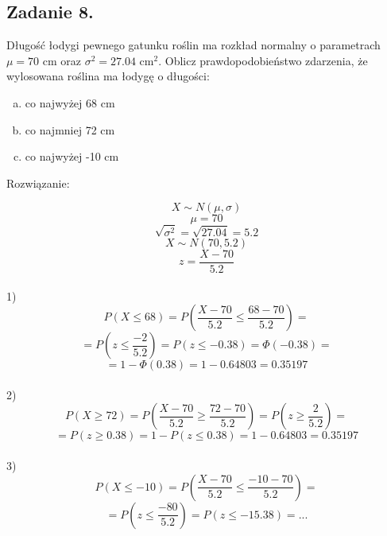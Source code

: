 
\subsection{Zadanie 8.}
Długość łodygi pewnego gatunku roślin ma rozkład normalny o parametrach $\mu = 70$ cm oraz $\sigma^2 = 27.04$ $\mbox{cm}^2$.
Oblicz prawdopodobieństwo zdarzenia, że wylosowana roślina ma łodygę o długości:
\begin{enumerate}[a)]
\item co najwyżej 68 cm
\item co najmniej  72 cm
\item co najwyżej -10 cm
\end{enumerate}


Rozwiązanie:

$$ X \sim N ( \mu, \sigma ) $$
$$\mu = 70$$
$$ \sqrt{ \sigma^2 } = \sqrt{27.04} = 5.2 $$
$$ X \sim N ( 70, 5.2 ) $$
$$ z = \frac{X - 70}{5.2} $$ \\

1) 
$$ P( X \le 68 ) = P(  \frac{X - 70}{5.2} \le \frac{68 - 70}{5.2} ) = $$
$$ = P( z \le \frac{-2}{5.2} ) =  P( z \le -0.38 ) = \Phi(-0.38) = $$
$$ = 1 - \Phi(0.38) = 1 - 0.64803 = 0.35197 $$ \\


2)
$$ P( X \ge 72 ) = P( \frac{X - 70}{5.2} \ge \frac{72 - 70}{5.2} ) = P( z \ge \frac{2}{5.2} ) =  $$
$$ = P(z \ge 0.38 ) = 1 - P( z \le 0.38 ) = 1 - 0.64803 = 0.35197 $$ \\


3)
$$ P( X \le -10 ) = P( \frac{X - 70}{5.2} \le \frac{-10 - 70}{5.2} ) = $$
$$ = P( z \le \frac{-80}{5.2} ) = P( z \le -15.38 ) = . . .$$
